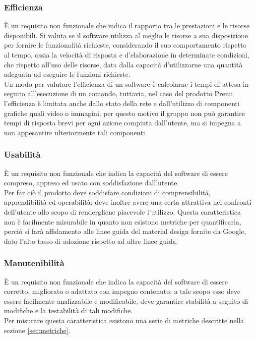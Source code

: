 \subsubsection{Efficienza}
È un requisito non funzionale che indica il rapporto tra le prestazioni e le risorse disponibili.
Si valuta se il software utilizza al meglio le risorse a sua disposizione per fornire le funzionalità richieste, considerando il suo comportamento rispetto al tempo, ossia la velocità di risposta e d'elaborazione in determinate condizioni, che rispetto all’uso delle risorse, data dalla capacità d'utilizzarne una quantità adeguata ad eseguire le funzioni richieste. \\
Un modo per valutare l’efficienza di un software è calcolarne i tempi di attesa in seguito all’esecuzione di un comando, tuttavia, nel caso del prodotto Premi l'efficienza è limitata anche dallo stato della rete e dall'utilizzo di componenti grafiche quali video o immagini; per questo motivo il gruppo non può garantire tempi di risposta brevi per ogni azione compiuta dall’utente, ma si impegna a non appesantire ulteriormente tali componenti.

\subsubsection{Usabilità}
È un requisito non funzionale che indica la capacità del software di essere compreso, appreso ed usato con soddisfazione dall'utente. \\
Per far ciò il prodotto deve soddisfare condizioni di comprensibilità, apprendibilità ed operabilità; deve inoltre avere una certa attrattiva nei confronti dell'utente allo scopo di rendergliene piacevole l’utilizzo. Questa caratteristica non è facilmente misurabile in quanto non esistono metriche per quantificarla, perciò si farà affidamento alle linee guida del material design fornite da Google, dato l'alto tasso di adozione rispetto ad altre linee guida.

\subsubsection{Manutenibilità}
È un requisito non funzionale che indica la capacità del software di essere corretto, migliorato o adattato con impegno contenuto; a tale scopo esso deve essere facilmente analizzabile e modificabile, deve garantire stabilità a seguito di modifiche e la testabilità di tali modifiche.  \\
Per misurare questa caratteristica esistono una serie di metriche descritte nella sezione \ref{sec:metriche}.

